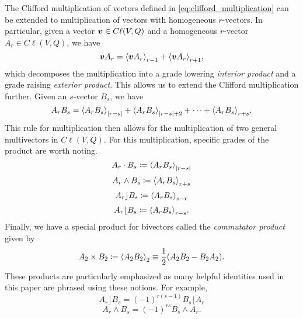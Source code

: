 The Clifford multiplication of vectors defined in \ref{eq:clifford_multiplication} can be extended to multiplication of vectors with homogeneous $r$-vectors.  In particular, given a vector $\boldsymbol{v} \in C\ell(V,Q)$ and a homogeneous $r$-vector $A_r \in C\ell(V,Q)$, we have
\begin{equation}
\label{eq:vector_multiplication}
\blade{v}A_r = \proj{r-1}{\blade{v}A_r} + \proj{r+1}{\blade{v}A_r},
\end{equation}
which decomposes the multiplication into a grade lowering \emph{interior product} and a grade raising \emph{exterior product}.  This allows us to extend the Clifford multiplication further. Given an $s$-vector $B_s$, we have
\begin{equation}
\label{eq:general_clifford_multiplication}
A_r B_s = \proj{|r-s|}{A_rB_s} + \proj{|r-s|+2}{A_rB_s} + \cdots + \proj{r+s}{A_rB_s}.
\end{equation}
This rule for multiplication then allows for the multiplication of two general multivectors in $C\ell(V,Q)$. For this multiplication, specific grades of the product are worth noting.
\begin{equation}
\label{eq:dot}
    A_r \cdot B_s \coloneqq \proj{|r-s|}{A_r B_s}
\end{equation}
\begin{equation}
\label{eq:wedge}
    A_r \wedge B_s \coloneqq \proj{r+s}{A_r B_s}
\end{equation}
\begin{equation}
\label{eq:left_contraction}
    A_r \rfloor B_s \coloneqq \proj{s-r}{A_r B_s}
\end{equation}
\begin{equation}
\label{eq:right_contraction}
    A_r \lfloor B_s \coloneqq \proj{r-s}{A_r B_s}.
\end{equation}
Finally, we have a special product for bivectors called the \emph{commutator product} given by
\begin{equation}
\label{eq:commutator_product}
    A_2 \times B_2 \coloneqq \proj{2}{A_2 B_2} \equiv \frac{1}{2} (A_2 B_2 - B_2 A_2).
\end{equation}
These products are particularly emphasized as many helpful identities used in this paper are phrased using these notions. For example,
\begin{equation}
\label{eq:contraction_swap}
A_r \rfloor B_s = (-1)^{r(s-1)}B_s \lfloor A_r
\end{equation}
\begin{equation}
\label{eq:wedge_swap}
A_r \wedge B_s = (-1)^{rs}B_s\wedge A_r.
\end{equation}
